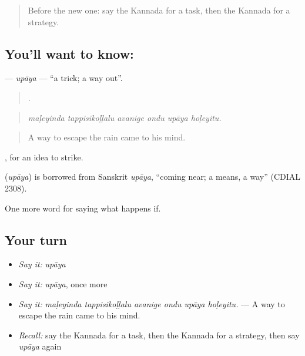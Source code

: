 \label{lesson:KA-C423-upaya}



\begin{quote}
Before the new one: say the Kannada for a task, then the Kannada for a strategy.
\end{quote}

\subsection*{You'll want to know: }
\textbf{} — \emph{upāya} — \textquotedblleft{}a trick; a way out\textquotedblright{}.

\begin{quote}
     .
\end{quote}

\begin{quote}
\emph{maḷeyinda tappisikoḷḷalu avanige ondu upāya hoḷeyitu.}
\end{quote}

\begin{quote}
A way to escape the rain came to his mind.
\end{quote}

 , for an idea to strike.

\begin{cousinweb}
\textbf{} (\emph{upāya}) is borrowed from Sanskrit \emph{upāya}, \textquotedblleft{}coming near; a means, a way\textquotedblright{} (CDIAL 2308).
\end{cousinweb}

\begin{grammarlens}[title={What you've built}]
One more word for saying what happens if.
\end{grammarlens}

\subsection*{Your turn}
\begin{itemize}
\raggedright
  \item \emph{Say it:} \emph{upāya}
  \item \emph{Say it:} \emph{upāya}, once more
  \item \emph{Say it:} \emph{maḷeyinda tappisikoḷḷalu avanige ondu upāya hoḷeyitu.} — A way to escape the rain came to his mind.
  \item \emph{Recall:} say the Kannada for a task, then the Kannada for a strategy, then say \emph{upāya} again
\end{itemize}


